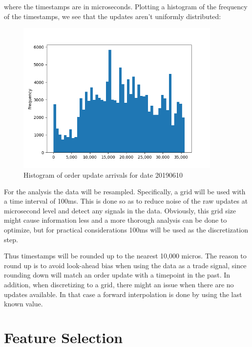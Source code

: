 \documentclass[english, 11pt, a4paper]{article}
\begin{document}
where the timestamps are in microseconds. Plotting a histogram of the frequency of the timestamps,
we see that the updates aren't uniformly distributed: 

 \begin{figure}[H] 
	\centering
	\includegraphics[width=0.90\textwidth]{../data/figures/hist_20190610_timestamps.png}
	\caption{Histogram of order update arrivals for date 20190610}
	\label{fig1}
\end{figure}

For the analysis the data will be resampled. Specifically, a grid will be used with a time interval of
100ms. This is done so as to reduce noise of the raw updates at microsecond level and detect any
signals in the data. Obviously, this grid size might cause information less and a more thorough
analysis can be done to optimize, but for practical considerations 100ms will be used as the
discretization step. 

Thus timestamps will be rounded up to the nearest 10,000 micros.
The reason to round up is to avoid look-ahead bias when using the data as a trade signal, since
rounding down will match an order update with a timepoint in the past. In addition, when
discretizing to a grid, there might an issue when there are no updates available. In that case a
forward interpolation is done by using the last known value.

\section{Feature Selection}
\end{document}
